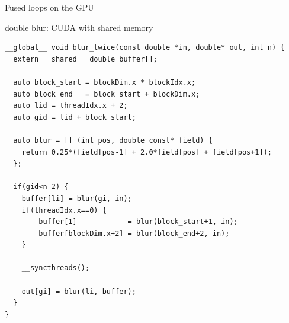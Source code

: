 \begin{frame}[fragile]{Fused loops on the GPU}
    \begin{code}{double blur: CUDA with shared memory}
        \begin{lstlisting}[style=boxcudatiny]
__global__ void blur_twice(const double *in, double* out, int n) {
  extern __shared__ double buffer[];

  auto block_start = blockDim.x * blockIdx.x;
  auto block_end   = block_start + blockDim.x;
  auto lid = threadIdx.x + 2;
  auto gid = lid + block_start;

  auto blur = [] (int pos, double const* field) {
    return 0.25*(field[pos-1] + 2.0*field[pos] + field[pos+1]);
  };

  if(gid<n-2) {
    buffer[li] = blur(gi, in);
    if(threadIdx.x==0) {
        buffer[1]            = blur(block_start+1, in);
        buffer[blockDim.x+2] = blur(block_end+2, in);
    }

    __syncthreads();

    out[gi] = blur(li, buffer);
  }
}
        \end{lstlisting}
    \end{code}
\end{frame}

